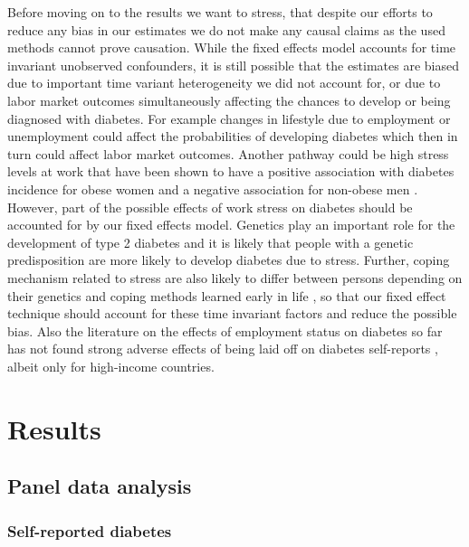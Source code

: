 \documentclass[12pt,english,british]{article}
\begin{document}
Before moving on to the results we want to stress, that despite our efforts to reduce any bias in our estimates we do not make any causal claims as the used methods cannot prove causation. While the fixed effects model accounts for time invariant
unobserved confounders, it is still possible that the estimates are biased
due to important time variant heterogeneity we did not account for, or
due to labor market outcomes simultaneously affecting the chances to develop or
being diagnosed with diabetes. For example changes in lifestyle due to
employment or unemployment could affect the probabilities of developing
diabetes which then in turn could affect labor market outcomes. Another pathway could be high stress levels at
work that have been shown to have a positive association with
diabetes incidence for obese women and a negative association for
non-obese men \citep{Heraclides2012,Eriksson2013}. However, part
of the possible effects of work stress on diabetes should be accounted
for by our fixed effects model. Genetics play an important role for
the development of type 2 diabetes and it is likely that people with
a genetic predisposition are more likely to develop diabetes due
to stress. Further, coping mechanism related to stress are also likely
to differ between persons depending on their genetics and coping
methods learned early in life \citep{Schneiderman2005}, so that our
fixed effect technique should account for these time invariant factors
and reduce the possible bias. Also the literature on the effects of employment
status on diabetes so far has not found strong adverse effects of being laid
off on diabetes self-reports \citep{Bergemann2011,Schaller2015},
albeit only for high-income countries.

\section{\label{sec:RESULTS} Results}


\subsection{Panel data analysis}

\subsubsection*{Self-reported diabetes}
\end{document}
